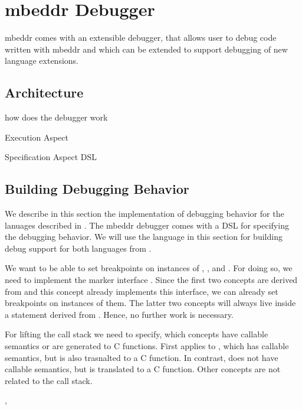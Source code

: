 \section{mbeddr Debugger}

mbeddr comes with an extensible debugger, that allows user to debug code written
with mbeddr and which can be extended to support debugging of new language
extensions.

\subsection{Architecture}
how does the debugger work

Execution Aspect

Specification Aspect
DSL


\subsection{Building Debugging Behavior}

We describe in this section the implementation of debugging behavior for the
lanuages described in . The mbeddr debugger
comes with a \ac{DSL} for specifying the debugging behavior. 
We will use the language in this section for
building debug support for both languages from .

 We want to be able to set breakpoints on instances of
, , and
.
For doing so, we need to implement the marker interface . 
Since the first two concepts
are derived from  and this concept already implements this
interface, we can already set breakpoints on instances of them. The latter two
concepts will always live inside a statement derived
from . Hence, no further work is necessary.

 For lifting the call stack we need to specify, which
concepts have callable semantics or are generated to C functions. First applies
to , which has callable semantics, but is also trasnalted to a C
function. In contrast,  does not have callable
semantics, but is translated to a C function. Other concepts are not
related to the call stack.

 ,  







